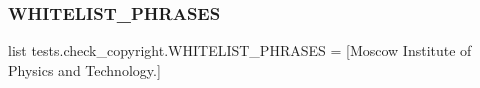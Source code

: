 \subsubsection{\texorpdfstring{W\+H\+I\+T\+E\+L\+I\+S\+T\+\_\+\+P\+H\+R\+A\+S\+ES}{WHITELIST\_PHRASES}}
{\footnotesize\ttfamily list tests.\+check\+\_\+copyright.\+W\+H\+I\+T\+E\+L\+I\+S\+T\+\_\+\+P\+H\+R\+A\+S\+ES = \mbox{[}\textquotesingle{}Moscow Institute of Physics and Technology.\textquotesingle{}\mbox{]}}

